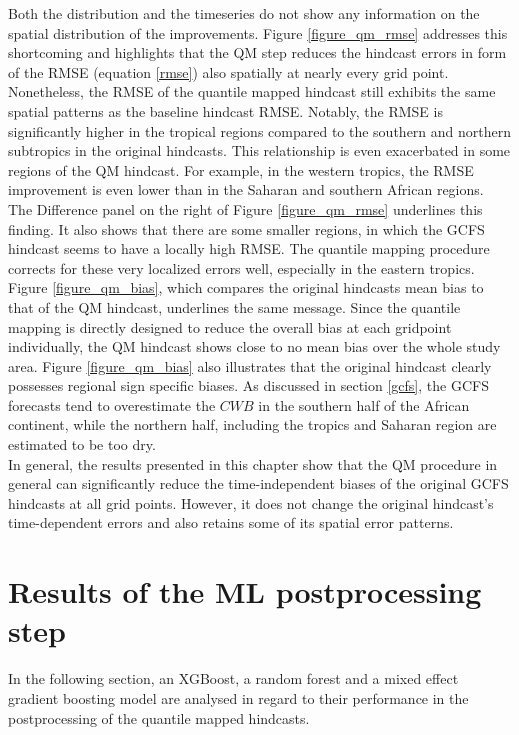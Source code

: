 \documentclass[ba-lentz.tex]{subfile}
\begin{document}
Both the distribution and the timeseries do not show any information on the spatial distribution of the improvements.
Figure \ref{figure_qm_rmse} addresses this shortcoming and highlights that the QM step reduces the hindcast errors in form of the RMSE (equation \ref{rmse}) also spatially at nearly every grid point.
Nonetheless, the RMSE of the quantile mapped hindcast still exhibits the same spatial patterns as the baseline hindcast RMSE.
Notably, the RMSE is significantly higher in the tropical regions compared to the southern and northern subtropics in the original hindcasts.
This relationship is even exacerbated in some regions of the QM hindcast.
For example, in the western tropics, the RMSE improvement is even lower than in the Saharan and southern African regions.
The Difference panel on the right of Figure \ref{figure_qm_rmse} underlines this finding.
It also shows that there are some smaller regions, in which the GCFS hindcast seems to have a locally high RMSE.
The quantile mapping procedure corrects for these very localized errors well, especially in the eastern tropics. \\
Figure \ref{figure_qm_bias}, which compares the original hindcasts mean bias to that of the QM hindcast, underlines the same message.
Since the quantile mapping is directly designed to reduce the overall bias at each gridpoint individually, the QM hindcast shows close to no mean bias over the whole study area.
Figure \ref{figure_qm_bias} also illustrates that the original hindcast clearly possesses regional sign specific biases.
As discussed in section \ref{gcfs}, the GCFS forecasts tend to overestimate the $CWB$ in the southern half of the African continent, while the northern half, including the tropics and Saharan region are estimated to be too dry. \\
In general, the results presented in this chapter show that the QM procedure in general can significantly reduce the time-independent biases of the original GCFS hindcasts at all grid points.
However, it does not change the original hindcast's time-dependent errors and also retains some of its spatial error patterns.


\section{Results of the ML postprocessing step}\label{results_ml}

In the following section, an XGBoost, a random forest and a mixed effect gradient boosting model are analysed in regard to their performance in the postprocessing of the quantile mapped hindcasts.
\end{document}
